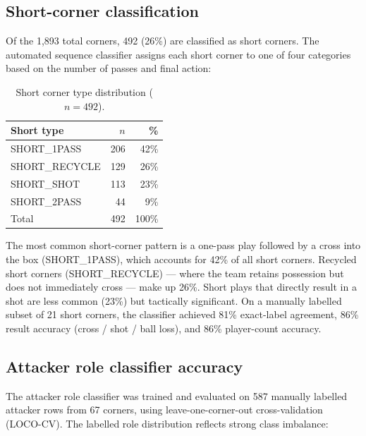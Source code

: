 \subsection{Short-corner classification}

Of the 1{,}893 total corners, 492 (26\%) are classified as short corners.
The automated sequence classifier assigns each short corner to one of
four categories based on the number of passes and final action:

\begin{table}[h]
  \centering
  \caption{Short corner type distribution ($n = 492$).}
  \label{tab:sq2_short}
  \begin{tabular}{lrr}
    \toprule
    \textbf{Short type} & \textbf{$n$} & \textbf{\%} \\
    \midrule
    SHORT\_1PASS    & 206 & 42\% \\
    SHORT\_RECYCLE  & 129 & 26\% \\
    SHORT\_SHOT     & 113 & 23\% \\
    SHORT\_2PASS    &  44 &  9\% \\
    \midrule
    Total           & 492 & 100\% \\
    \bottomrule
  \end{tabular}
\end{table}

The most common short-corner pattern is a one-pass play followed by a
cross into the box (SHORT\_1PASS), which accounts for 42\% of all short
corners. Recycled short corners (SHORT\_RECYCLE) — where the team
retains possession but does not immediately cross — make up 26\%. Short
plays that directly result in a shot are less common (23\%) but
tactically significant. On a manually labelled subset of 21 short
corners, the classifier achieved 81\% exact-label agreement, 86\% result
accuracy (cross / shot / ball loss), and 86\% player-count accuracy.

\subsection{Attacker role classifier accuracy}
\label{sec:results_sq2_roles}

The attacker role classifier was trained and evaluated on 587 manually
labelled attacker rows from 67 corners, using leave-one-corner-out
cross-validation (LOCO-CV). The labelled role distribution reflects
strong class imbalance:

